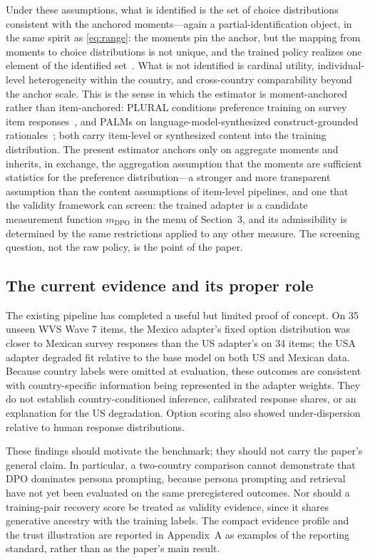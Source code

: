 \documentclass[10pt,letterpaper]{article}
\begin{document}
Under these assumptions, what is identified is the set of choice distributions consistent with the anchored moments---again a partial-identification object, in the same spirit as \eqref{eq:range}: the moments pin the anchor, but the mapping from moments to choice distributions is not unique, and the trained policy realizes one element of the identified set~\cite{manski2003}. What is not identified is cardinal utility, individual-level heterogeneity within the country, and cross-country comparability beyond the anchor scale. This is the sense in which the estimator is moment-anchored rather than item-anchored: PLURAL conditions preference training on survey item responses~\cite{plural2026}, and PALMs on language-model-synthesized construct-grounded rationales~\cite{palms2026}; both carry item-level or synthesized content into the training distribution. The present estimator anchors only on aggregate moments and inherits, in exchange, the aggregation assumption that the moments are sufficient statistics for the preference distribution---a stronger and more transparent assumption than the content assumptions of item-level pipelines, and one that the validity framework can screen: the trained adapter is a candidate measurement function $m_{\mathrm{DPO}}$ in the menu of Section~3, and its admissibility is determined by the same restrictions applied to any other measure. The screening question, not the raw policy, is the point of the paper.

\subsection{The current evidence and its proper role}
The existing pipeline has completed a useful but limited proof of concept. On 35 unseen WVS Wave 7 items, the Mexico adapter's fixed option distribution was closer to Mexican survey responses than the US adapter's on 34 items; the USA adapter degraded fit relative to the base model on both US and Mexican data. Because country labels were omitted at evaluation, these outcomes are consistent with country-specific information being represented in the adapter weights. They do not establish country-conditioned inference, calibrated response shares, or an explanation for the US degradation. Option scoring also showed under-dispersion relative to human response distributions.

These findings should motivate the benchmark; they should not carry the paper's general claim. In particular, a two-country comparison cannot demonstrate that DPO dominates persona prompting, because persona prompting and retrieval have not yet been evaluated on the same preregistered outcomes. Nor should a training-pair recovery score be treated as validity evidence, since it shares generative ancestry with the training labels. The compact evidence profile and the trust illustration are reported in Appendix~A as examples of the reporting standard, rather than as the paper's main result.
\end{document}
